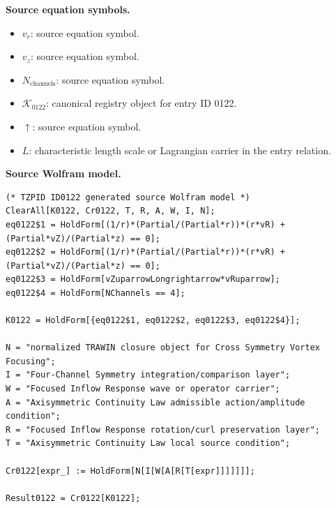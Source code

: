 \begin{minipage}[t]{0.49\linewidth}
\begingroup
\small
\raggedright
\textbf{Source equation symbols.}\par
\begin{itemize}[leftmargin=1.35em,itemsep=1pt,topsep=1pt,parsep=0pt]
    \item $v_r$: source equation symbol.
    \item $v_z$: source equation symbol.
    \item $N_{\mathrm{channels}}$: source equation symbol.
    \item $\mathcal{K}_{0122}$: canonical registry object for entry ID 0122.
    \item $\uparrow$: source equation symbol.
    \item $L$: characteristic length scale or Lagrangian carrier in the entry relation.
\end{itemize}
\endgroup
\end{minipage}\hfill
\begin{minipage}[t]{0.47\linewidth}
\begingroup
\scriptsize
\raggedright
\textbf{Source Wolfram model.}\par
\begin{Verbatim}[fontsize=\tiny,breaklines=true,breakanywhere=true]
(* TZPID ID0122 generated source Wolfram model *)
ClearAll[K0122, Cr0122, T, R, A, W, I, N];
eq0122$1 = HoldForm[(1/r)*(Partial/(Partial*r))*(r*vR) + (Partial*vZ)/(Partial*z) == 0];
eq0122$2 = HoldForm[(1/r)*(Partial/(Partial*r))*(r*vR) + (Partial*vZ)/(Partial*z) == 0];
eq0122$3 = HoldForm[vZuparrowLongrightarrow*vRuparrow];
eq0122$4 = HoldForm[NChannels == 4];

K0122 = HoldForm[{eq0122$1, eq0122$2, eq0122$3, eq0122$4}];

N = "normalized TRAWIN closure object for Cross Symmetry Vortex Focusing";
I = "Four-Channel Symmetry integration/comparison layer";
W = "Focused Inflow Response wave or operator carrier";
A = "Axisymmetric Continuity Law admissible action/amplitude condition";
R = "Focused Inflow Response rotation/curl preservation layer";
T = "Axisymmetric Continuity Law local source condition";

Cr0122[expr_] := HoldForm[N[I[W[A[R[T[expr]]]]]]];

Result0122 = Cr0122[K0122];
\end{Verbatim}
\endgroup
\end{minipage}

